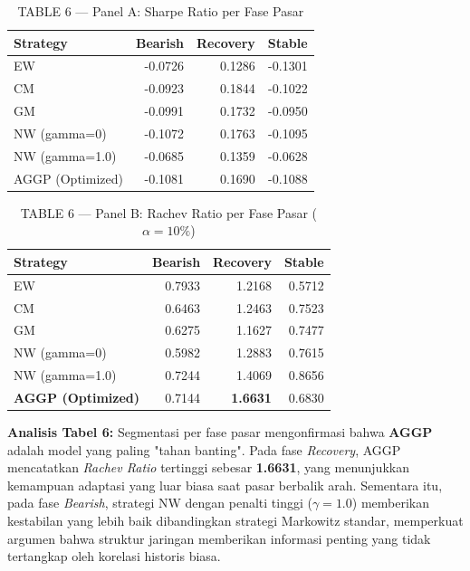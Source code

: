 \documentclass[12pt,a4paper]{article}
\begin{document}
\vspace{6pt}
\begin{table}[H]
  \centering
  \caption{TABLE 6 --- Panel A: Sharpe Ratio per Fase Pasar}
  \begin{tabular}{lrrr}
    \toprule
    \textbf{Strategy} & \textbf{Bearish} & \textbf{Recovery} & \textbf{Stable} \\
    \midrule
    \midrule
    EW                        & -0.0726 &  0.1286 & -0.1301 \\
    CM                        & -0.0923 &  0.1844 & -0.1022 \\
    GM                        & -0.0991 &  0.1732 & -0.0950 \\
    NW (gamma=0)              & -0.1072 &  0.1763 & -0.1095 \\
    NW (gamma=1.0)            & -0.0685 &  0.1359 & -0.0628 \\
    AGGP (Optimized)          & -0.1081 &  0.1690 & -0.1088 \\
    \bottomrule
  \end{tabular}
\end{table}

\begin{table}[H]
  \centering
  \caption{TABLE 6 --- Panel B: Rachev Ratio per Fase Pasar ($\alpha=10\%$)}
  \begin{tabular}{lrrr}
    \toprule
    \textbf{Strategy} & \textbf{Bearish} & \textbf{Recovery} & \textbf{Stable} \\
    \midrule
    \midrule
    EW                        & 0.7933 & 1.2168 & 0.5712 \\
    CM                        & 0.6463 & 1.2463 & 0.7523 \\
    GM                        & 0.6275 & 1.1627 & 0.7477 \\
    NW (gamma=0)              & 0.5982 & 1.2883 & 0.7615 \\
    NW (gamma=1.0)            & 0.7244 & 1.4069 & 0.8656 \\
    \textbf{AGGP (Optimized)} & 0.7144 & \textbf{1.6631} & 0.6830 \\
    \bottomrule
  \end{tabular}
\end{table}

\textbf{Analisis Tabel 6:} Segmentasi per fase pasar mengonfirmasi bahwa \textbf{AGGP} adalah model yang paling "tahan banting". Pada fase \textit{Recovery}, AGGP mencatatkan \textit{Rachev Ratio} tertinggi sebesar \textbf{1.6631}, yang menunjukkan kemampuan adaptasi yang luar biasa saat pasar berbalik arah. Sementara itu, pada fase \textit{Bearish}, strategi NW dengan penalti tinggi ($\gamma=1.0$) memberikan kestabilan yang lebih baik dibandingkan strategi Markowitz standar, memperkuat argumen bahwa struktur jaringan memberikan informasi penting yang tidak tertangkap oleh korelasi historis biasa.
\end{document}
